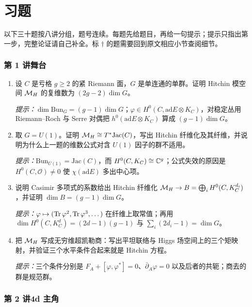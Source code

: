 \section{习题}

以下三十题按八讲分组，题号连续。每题先给题目，再给一句提示；提示只指出第一步，完整论证请自己补全。标 $\dagger$ 的题需要回到原文相应小节查阅细节。

\subsubsection*{第 1 讲\quad 舞台}

\begin{enumerate}[label=\arabic*.,start=1,leftmargin=2.4em,itemsep=6pt]
\item 设 $C$ 是亏格 $g\ge2$ 的紧 Riemann 面，$G$ 是单连通的单群。证明 Hitchin 模空间 $\mathcal{M}_{H}$ 的复维数为 $(2g-2)\dim G$。
\par\smallskip\noindent\emph{提示：}$\dim\mathrm{Bun}_G=(g-1)\dim G$；$\varphi\in H^0(C,\mathrm{ad}E\otimes K_C)$，对稳定丛用 Riemann--Roch 与 Serre 对偶把 $h^0(\mathrm{ad}E\otimes K_C)$ 算成 $(g-1)\dim G$。

\item 取 $G=U(1)$。证明 $\mathcal{M}_{H}\cong T^*\mathrm{Jac}(C)$，写出 Hitchin 纤维化及其纤维，并说明为什么上一题的维数公式对含 $U(1)$ 因子的群不适用。
\par\smallskip\noindent\emph{提示：}$\mathrm{Bun}_{U(1)}=\mathrm{Jac}(C)$，而 $H^0(C,K_C)\cong\mathbb{C}^g$；公式失效的原因是 $H^0(C,\mathcal O)\neq0$ 使 $\chi(\mathrm{ad}E)$ 多出中心项。

\item 说明 Casimir 多项式的系数给出 Hitchin 纤维化 $\mathcal{M}_{H}\to B=\bigoplus_iH^0(C,K_C^{d_i})$，并证明 $\dim B=(g-1)\dim G$。
\par\smallskip\noindent\emph{提示：}$\varphi\mapsto(\operatorname{Tr}\varphi^2,\operatorname{Tr}\varphi^3,\dots)$ 在纤维上取常值；再用 $\dim H^0(C,K_C^{d})=(2d-1)(g-1)$ 与 $\sum_i(2d_i-1)=\dim G$。

\item 把 $\mathcal{M}_{H}$ 写成无穷维超凯勒商：写出平坦联络与 Higgs 场空间上的三个矩映射，并验证三个水平条件合起来就是 Hitchin 方程。
\par\smallskip\noindent\emph{提示：}三个条件分别是 $F_A+[\varphi,\varphi^*]=0$、$\bar\partial_A\varphi=0$ 以及后者的共轭；商去的群是规范群。
\end{enumerate}

\subsubsection*{第 2 讲\quad 4d 主角}

